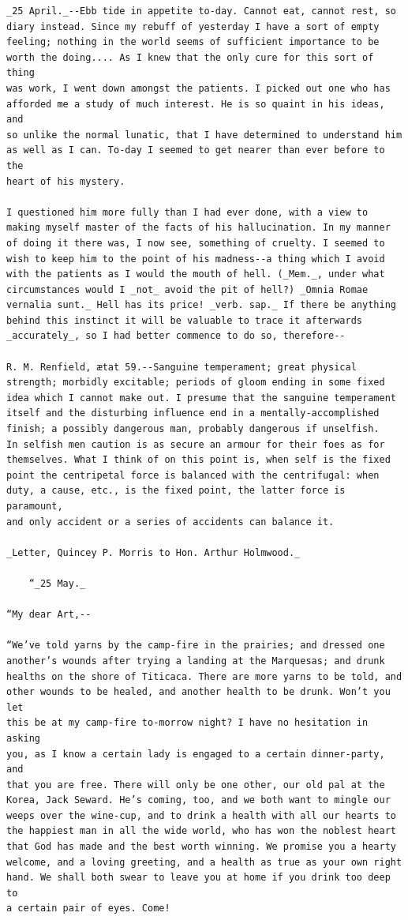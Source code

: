 \documentclass{article}
\begin{document}
\begin{verbatim}
_25 April._--Ebb tide in appetite to-day. Cannot eat, cannot rest, so
diary instead. Since my rebuff of yesterday I have a sort of empty
feeling; nothing in the world seems of sufficient importance to be
worth the doing.... As I knew that the only cure for this sort of thing
was work, I went down amongst the patients. I picked out one who has
afforded me a study of much interest. He is so quaint in his ideas, and
so unlike the normal lunatic, that I have determined to understand him
as well as I can. To-day I seemed to get nearer than ever before to the
heart of his mystery.

I questioned him more fully than I had ever done, with a view to
making myself master of the facts of his hallucination. In my manner
of doing it there was, I now see, something of cruelty. I seemed to
wish to keep him to the point of his madness--a thing which I avoid
with the patients as I would the mouth of hell. (_Mem._, under what
circumstances would I _not_ avoid the pit of hell?) _Omnia Romae
vernalia sunt._ Hell has its price! _verb. sap._ If there be anything
behind this instinct it will be valuable to trace it afterwards
_accurately_, so I had better commence to do so, therefore--

R. M. Renfield, ætat 59.--Sanguine temperament; great physical
strength; morbidly excitable; periods of gloom ending in some fixed
idea which I cannot make out. I presume that the sanguine temperament
itself and the disturbing influence end in a mentally-accomplished
finish; a possibly dangerous man, probably dangerous if unselfish.
In selfish men caution is as secure an armour for their foes as for
themselves. What I think of on this point is, when self is the fixed
point the centripetal force is balanced with the centrifugal: when
duty, a cause, etc., is the fixed point, the latter force is paramount,
and only accident or a series of accidents can balance it.

_Letter, Quincey P. Morris to Hon. Arthur Holmwood._

    “_25 May._

“My dear Art,--

“We’ve told yarns by the camp-fire in the prairies; and dressed one
another’s wounds after trying a landing at the Marquesas; and drunk
healths on the shore of Titicaca. There are more yarns to be told, and
other wounds to be healed, and another health to be drunk. Won’t you let
this be at my camp-fire to-morrow night? I have no hesitation in asking
you, as I know a certain lady is engaged to a certain dinner-party, and
that you are free. There will only be one other, our old pal at the
Korea, Jack Seward. He’s coming, too, and we both want to mingle our
weeps over the wine-cup, and to drink a health with all our hearts to
the happiest man in all the wide world, who has won the noblest heart
that God has made and the best worth winning. We promise you a hearty
welcome, and a loving greeting, and a health as true as your own right
hand. We shall both swear to leave you at home if you drink too deep to
a certain pair of eyes. Come!


\end{verbatim}
\end{document}
